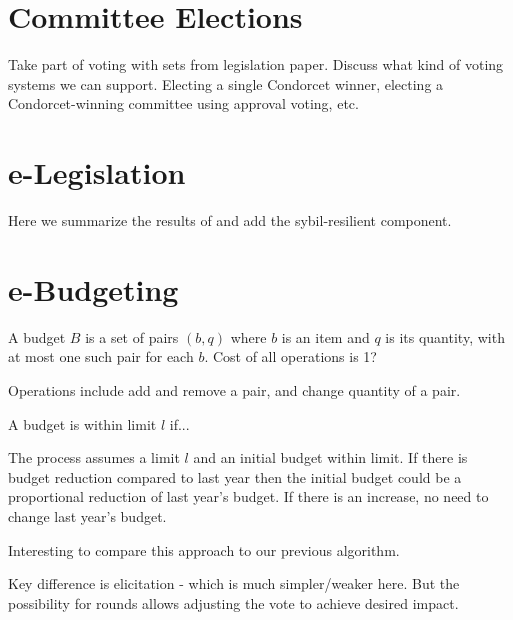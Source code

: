 \documentclass[sigconf]{aamas}  %
\begin{document}
\section{Committee Elections}

Take part of voting with sets from legislation paper.
Discuss what kind of voting systems we can support.
Electing a single Condorcet winner, electing a Condorcet-winning committee using approval voting, etc.

\section{e-Legislation}

Here we summarize the results of \cite{legislation} and add the sybil-resilient component.

\section{e-Budgeting}

A budget $B$ is a set of pairs $(b,q)$ where $b$ is an item and $q$ is its quantity, with at most one such pair for each $b$.
Cost of all operations is 1?

Operations include add and remove a pair, and change quantity of a pair.

A budget is within limit $l$ if...

The process assumes a limit $l$ and an initial budget within limit. If there is budget reduction compared to last year then the initial budget could be a proportional reduction of last year's budget.  If there is an increase, no need to change last year's budget.

Interesting to compare this approach to our previous algorithm.

Key difference is elicitation - which is much simpler/weaker here.
But the possibility for rounds allows adjusting the vote to achieve desired impact.
\end{document}
